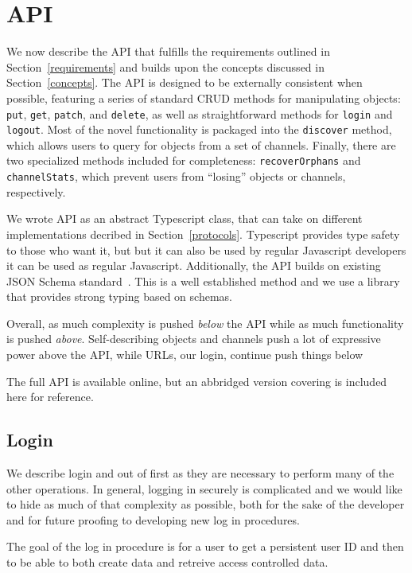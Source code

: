 \section{API}

We now describe the API that fulfills the requirements
outlined in Section~\ref{requirements} and builds upon the concepts
discussed in Section~\ref{concepts}.
The API is designed to be externally consistent when possible,
featuring a series of standard CRUD methods for manipulating objects:
\texttt{put}, \texttt{get}, \texttt{patch}, and \texttt{delete},
as well as straightforward methods for \texttt{login} and \texttt{logout}.
Most of the novel functionality is packaged into the \texttt{discover} method, which allows
users to query for objects from a set of channels.
Finally, there are two specialized methods included for completeness:
\texttt{recoverOrphans} and \texttt{channelStats},
which prevent users from ``losing'' objects or channels, respectively.

We wrote API as an abstract Typescript class, that can
take on different implementations decribed in Section~\ref{protocols}.
Typescript provides type safety to those who want it, but
but it can also be used by regular Javascript developers
it can be used as regular Javascript.
Additionally, the API builds on existing JSON Schema standard~\cite{jsonschema}.
This is a well established method and we use a library that
provides strong typing based on schemas.

Overall, as much complexity is pushed \emph{below} the API
while as much functionality is pushed \emph{above}.
Self-describing objects and channels push a lot of expressive
power above the API, while URLs, our login, continue push
things below

The full API is available online, but an abbridged version covering
is included here for reference.

\subsection{Login}

We describe login and out of first as they are necessary
to perform many of the other operations.
In general, logging in securely is complicated and we would
like to hide as much of that complexity as possible, both
for the sake of the developer and for future proofing to
developing new log in procedures.

The goal of the log in procedure is for a user to
get a persistent user ID and then to be able to both
create data and retreive access controlled data.

